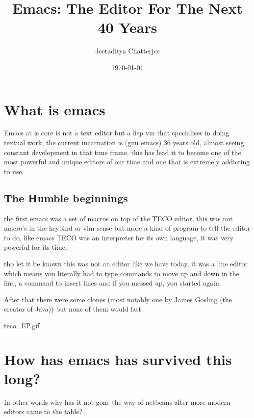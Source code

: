 \documentclass[a4paper]{article}
\author{Jeetaditya Chatterjee}
\date{\today}
\title{Emacs: The Editor For The Next 40 Years}
\begin{document}
\maketitle


\section*{What is emacs}
\label{sec:org3cf4b14}
\begin{notes}
Emacs at is core is not a text editor but a lisp vm that specialises in doing
textual work, the current incarnation is (gnu emacs) 36 years old, almost seeing constant
development in that time frame. this has lead it to become one of the most
powerful and unique editors of our time and one that is extremely addicting to
use.
\end{notes}
\subsection*{The Humble beginnings}
\label{sec:org8223b0f}
\begin{notes}
the first emacs was a set of macros on top of the TECO editor, this was not
macro's in the keybind or vim sense but more a kind of program to tell the
editor to do, like emacs TECO was an interpreter for its own language, it was
very powerful for its time.

tho let it be known this was not an editor like we have today, it was a line
editor which means you literally had to type commands to move up and down in the
line, a command to insert lines and if you messed up, you started again.

After that there were some clones (most notably one by James Gosling (the
creator of Java)) but none of them would last
\end{notes}
\url{teco\_EP.gif}
\section*{How has emacs has survived this long?}
\label{sec:org6bd8c4f}
\begin{notes}
In other words why has it not gone the way of netbeans after more modern editors
came to the table?
\end{notes}
\end{document}
